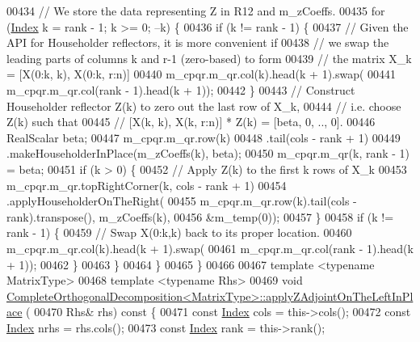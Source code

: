 \begin{DoxyCode}
00434     \textcolor{comment}{// We store the data representing Z in R12 and m\_zCoeffs.}
00435     \textcolor{keywordflow}{for} (\hyperlink{namespace_eigen_a62e77e0933482dafde8fe197d9a2cfde}{Index} k = rank - 1; k >= 0; --k) \{
00436       \textcolor{keywordflow}{if} (k != rank - 1) \{
00437         \textcolor{comment}{// Given the API for Householder reflectors, it is more convenient if}
00438         \textcolor{comment}{// we swap the leading parts of columns k and r-1 (zero-based) to form}
00439         \textcolor{comment}{// the matrix X\_k = [X(0:k, k), X(0:k, r:n)]}
00440         m\_cpqr.m\_qr.col(k).head(k + 1).swap(
00441             m\_cpqr.m\_qr.col(rank - 1).head(k + 1));
00442       \}
00443       \textcolor{comment}{// Construct Householder reflector Z(k) to zero out the last row of X\_k,}
00444       \textcolor{comment}{// i.e. choose Z(k) such that}
00445       \textcolor{comment}{// [X(k, k), X(k, r:n)] * Z(k) = [beta, 0, .., 0].}
00446       RealScalar beta;
00447       m\_cpqr.m\_qr.row(k)
00448           .tail(cols - rank + 1)
00449           .makeHouseholderInPlace(m\_zCoeffs(k), beta);
00450       m\_cpqr.m\_qr(k, rank - 1) = beta;
00451       \textcolor{keywordflow}{if} (k > 0) \{
00452         \textcolor{comment}{// Apply Z(k) to the first k rows of X\_k}
00453         m\_cpqr.m\_qr.topRightCorner(k, cols - rank + 1)
00454             .applyHouseholderOnTheRight(
00455                 m\_cpqr.m\_qr.row(k).tail(cols - rank).transpose(), m\_zCoeffs(k),
00456                 &m\_temp(0));
00457       \}
00458       \textcolor{keywordflow}{if} (k != rank - 1) \{
00459         \textcolor{comment}{// Swap X(0:k,k) back to its proper location.}
00460         m\_cpqr.m\_qr.col(k).head(k + 1).swap(
00461             m\_cpqr.m\_qr.col(rank - 1).head(k + 1));
00462       \}
00463     \}
00464   \}
00465 \}
00466 
00467 \textcolor{keyword}{template} <\textcolor{keyword}{typename} MatrixType>
00468 \textcolor{keyword}{template} <\textcolor{keyword}{typename} Rhs>
00469 \textcolor{keywordtype}{void} \hyperlink{group___q_r___module_a0a89641e0b4ea92c515405f2a31e6abe}{CompleteOrthogonalDecomposition<MatrixType>::applyZAdjointOnTheLeftInPlace}
      (
00470     Rhs& rhs)\textcolor{keyword}{ const }\{
00471   \textcolor{keyword}{const} \hyperlink{namespace_eigen_a62e77e0933482dafde8fe197d9a2cfde}{Index} cols = this->cols();
00472   \textcolor{keyword}{const} \hyperlink{namespace_eigen_a62e77e0933482dafde8fe197d9a2cfde}{Index} nrhs = rhs.cols();
00473   \textcolor{keyword}{const} \hyperlink{namespace_eigen_a62e77e0933482dafde8fe197d9a2cfde}{Index} rank = this->rank();

\end{DoxyCode}
